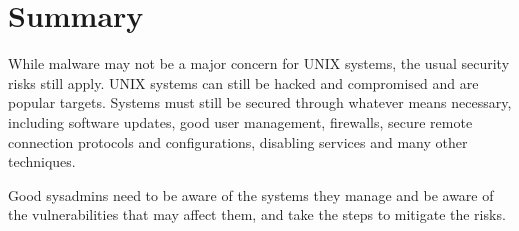 \section{Summary} 

While malware may not be a major concern for UNIX systems, the usual security risks still apply. UNIX systems can still be hacked and compromised and are popular targets. Systems must still be secured through whatever means necessary, including software updates, good user management, firewalls, secure remote connection protocols and configurations, disabling services and many other techniques.

Good sysadmins need to be aware of the systems they manage and be aware of the vulnerabilities that may affect them, and take the steps to mitigate the risks.